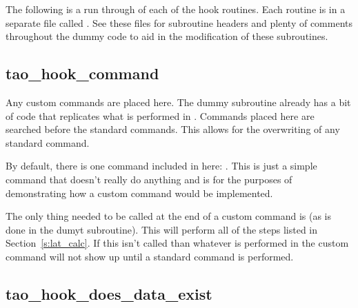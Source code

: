 The following is a run through of each of the hook routines. Each
routine is in a separate file called
. See these files for subroutine
headers and plenty of comments throughout the dummy code to aid in the
modification of these subroutines.

\subsection{tao\_hook\_command}

Any custom commands are placed here. The dummy subroutine already has
a bit of code that replicates what is performed in
. Commands placed here are searched before the
standard \tao commands. This allows for the overwriting of any
standard \tao command.

By default, there is one command included in here: . This
is just a simple command that doesn't really do anything and is for
the purposes of demonstrating how a custom command would be
implemented.

The only thing needed to be called at the end of a custom command is
 (as is done in the dumyt subroutine). This will
perform all of the steps listed in Section~\ref{s:lat_calc}. If this
isn't called than whatever is performed in the custom command will not
show up until a standard command is performed.

\subsection{tao\_hook\_does\_data\_exist}

